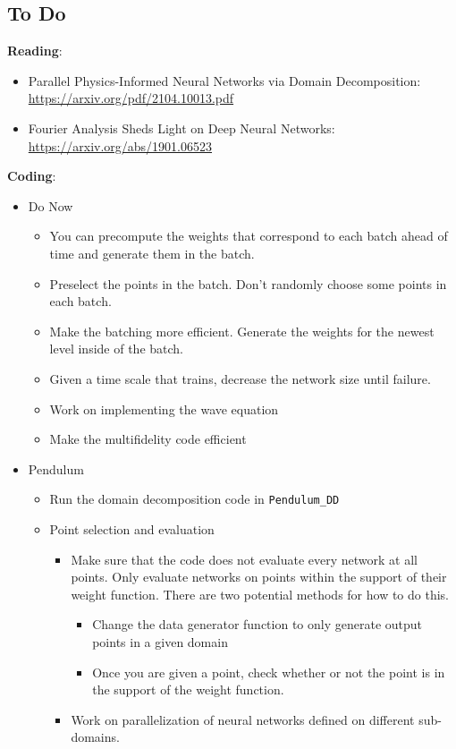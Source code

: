 \documentclass{article}
\def\bf{\textbf}
\begin{document}
\subsection*{To Do}
\bf{Reading}:
\begin{itemize}
	\item Parallel Physics-Informed Neural Networks via Domain Decomposition: \url{https://arxiv.org/pdf/2104.10013.pdf}
	\item Fourier Analysis Sheds Light on Deep Neural Networks: \url{https://arxiv.org/abs/1901.06523}
\end{itemize}
\bf{Coding}:
\begin{itemize}
	\item Do Now
	\begin{itemize}
		\item You can precompute the weights that correspond to each batch ahead of time and generate them in the batch.
		\item Preselect the points in the batch. Don't randomly choose some points in each batch.
		\item Make the batching more efficient. Generate the weights for the newest level inside of the batch.
		\item Given a time scale that trains, decrease the network size until failure.
		\item Work on implementing the wave equation
		\item Make the multifidelity code efficient
	\end{itemize}
	\item Pendulum
	\begin{itemize}
		\item Run the domain decomposition code in \verb|Pendulum_DD|
		\item Point selection and evaluation
		\begin{itemize}
			\item Make sure that the code does not evaluate every network at all points. Only evaluate networks on points within the support of their weight function. There are two potential methods for how to do this.
			\begin{itemize}
				\item Change the data generator function to only generate output points in a given domain 
				\item Once you are given a point, check whether or not the point is in the support of the weight function.
			\end{itemize}
			\item Work on parallelization of neural networks defined on different sub-domains.

\end{itemize}
\end{itemize}
\end{itemize}
\end{document}
